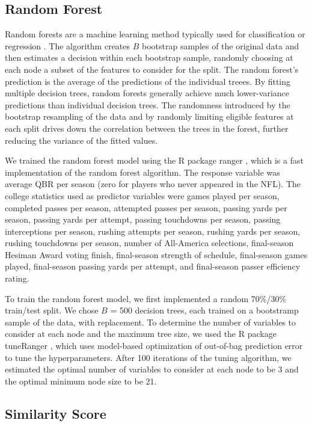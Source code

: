 \documentclass{article}
\begin{document}
\subsection{Random Forest}

Random forests are a machine learning method typically used for classification or regression \citep{breiman_random_2001}. The algorithm creates $B$ bootstrap samples of the original data and then estimates a decision within each bootstrap sample, randomly choosing at each node a subset of the features to consider for the split. The random forest's prediction is the average of the predictions of the individual treees. By fitting multiple decision trees, random forests generally achieve much lower-variance predictions than individual decision trees. The randomness introduced by the bootstrap resampling of the data and by randomly limiting eligible features at each split drives down the correlation between the trees in the forest, further reducing the variance of the fitted values.

We trained the random forest model using the R package ranger \citep{wright_ranger_2015}, which is a fast implementation of the random forest algorithm. The response variable was average QBR per season (zero for players who never appeared in the NFL). The college statistics used as predictor variables were games played per season, completed passes per season, attempted passes per season, passing yards per season, passing yards per attempt, passing touchdowns per season, passing interceptions per season, rushing attempts per season, rushing yards per season, rushing touchdowns per season, number of All-America selections, final-season Hesiman Award voting finish, final-season strength of schedule, final-season games played, final-season passing yards per attempt, and final-season passer efficiency rating.

To train the random forest model, we first implemented a random 70\%/30\% train/test split. We chose $B$ = 500 decision trees, each trained on a bootstramp sample of the data, with replacement. To determine the number of variables to consider at each node and the maximum tree size, we used the R package tuneRanger \citep{probst_tuneranger_2018}, which uses model-based optimization of out-of-bag prediction error to tune the hyperparameters. After 100 iterations of the tuning algorithm, we estimated the optimal number of variables to consider at each node to be 3 and the optimal minimum node size to be 21.

\subsection{Similarity Score}
\end{document}
